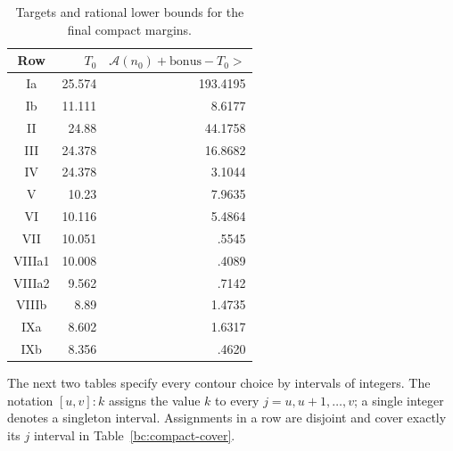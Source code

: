 \begin{table}[ht]
\centering\small
\caption{Targets and rational lower bounds for the final compact margins.}
\label{bc:compact-margins}
\begin{tabular}{@{}crr@{}}\toprule
Row&$T_0$&$\mathcal A(n_0)+\mathrm{bonus}-T_0>$\\\midrule
Ia & 25.574 & 193.4195\\
Ib & 11.111 & 8.6177\\
II & 24.88 & 44.1758\\
III & 24.378 & 16.8682\\
IV & 24.378 & 3.1044\\
V & 10.23 & 7.9635\\
VI & 10.116 & 5.4864\\
VII & 10.051 & .5545\\
VIIIa1 & 10.008 & .4089\\
VIIIa2 & 9.562 & .7142\\
VIIIb & 8.89 & 1.4735\\
IXa & 8.602 & 1.6317\\
IXb & 8.356 & .4620\\
\bottomrule\end{tabular}
\end{table}

The next two tables specify every contour choice by intervals of
integers.  The notation $[u,v]:k$ assigns the value $k$ to every
$j=u,u+1,\ldots,v$; a single integer denotes a singleton interval.
Assignments in a row are disjoint and cover exactly its $j$ interval
in Table~\ref{bc:compact-cover}.


